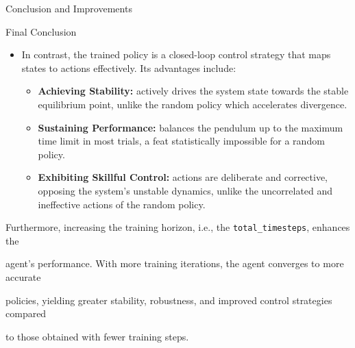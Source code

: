 \begin{frame}[fragile]{Conclusion and Improvements}
\begin{block}{Final Conclusion}
\begin{itemize}
  \begin{itemize}
  \item
    rapid system divergence,
  \item
    uniformly poor performance,
  \item
    complete inability to stabilize the pendulum,
  \item
    universally short episode durations.
  \end{itemize}
\item
  In contrast, the trained policy is a closed-loop control strategy that
  maps states to actions effectively. Its advantages include:

  \begin{itemize}
  \item
    \textbf{Achieving Stability:} actively drives the system state
    towards the stable equilibrium point, unlike the random policy which
    accelerates divergence.
  \item
    \textbf{Sustaining Performance:} balances the pendulum up to the
    maximum time limit in most trials, a feat statistically impossible
    for a random policy.
  \item
    \textbf{Exhibiting Skillful Control:} actions are deliberate and
    corrective, opposing the system's unstable dynamics, unlike the
    uncorrelated and ineffective actions of the random policy.
  \end{itemize}
\end{itemize}

Furthermore, increasing the training horizon, i.e., the
\texttt{total\_timesteps}, enhances the

agent's performance. With more training iterations, the agent converges
to more accurate

policies, yielding greater stability, robustness, and improved control
strategies compared

to those obtained with fewer training steps.
\end{block}
\end{frame}
